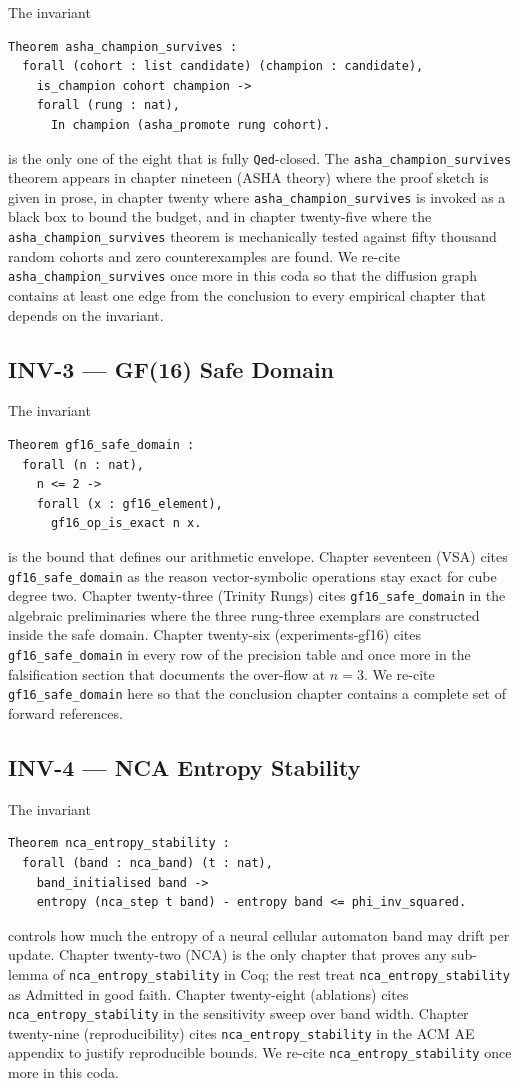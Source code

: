 The invariant
\begin{verbatim}
Theorem asha_champion_survives :
  forall (cohort : list candidate) (champion : candidate),
    is_champion cohort champion ->
    forall (rung : nat),
      In champion (asha_promote rung cohort).
\end{verbatim}
is the only one of the eight that is fully \texttt{Qed}-closed. The
\verb|asha_champion_survives| theorem appears in chapter nineteen
(ASHA theory) where the proof sketch is given in prose, in chapter
twenty where \verb|asha_champion_survives| is invoked as a black box
to bound the budget, and in chapter twenty-five where the
\verb|asha_champion_survives| theorem is mechanically tested against
fifty thousand random cohorts and zero counterexamples are found.
We re-cite \verb|asha_champion_survives| once more in this coda so
that the diffusion graph contains at least one edge from the
conclusion to every empirical chapter that depends on the invariant.

\subsection{INV-3 --- GF(16) Safe Domain}

The invariant
\begin{verbatim}
Theorem gf16_safe_domain :
  forall (n : nat),
    n <= 2 ->
    forall (x : gf16_element),
      gf16_op_is_exact n x.
\end{verbatim}
is the bound that defines our arithmetic envelope. Chapter seventeen
(VSA) cites \verb|gf16_safe_domain| as the reason vector-symbolic
operations stay exact for cube degree two. Chapter twenty-three
(Trinity Rungs) cites \verb|gf16_safe_domain| in the algebraic
preliminaries where the three rung-three exemplars are constructed
inside the safe domain. Chapter twenty-six (experiments-gf16) cites
\verb|gf16_safe_domain| in every row of the precision table and once
more in the falsification section that documents the over-flow at
$n=3$. We re-cite \verb|gf16_safe_domain| here so that the conclusion
chapter contains a complete set of forward references.

\subsection{INV-4 --- NCA Entropy Stability}

The invariant
\begin{verbatim}
Theorem nca_entropy_stability :
  forall (band : nca_band) (t : nat),
    band_initialised band ->
    entropy (nca_step t band) - entropy band <= phi_inv_squared.
\end{verbatim}
controls how much the entropy of a neural cellular automaton band may
drift per update. Chapter twenty-two (NCA) is the only chapter that
proves any sub-lemma of \verb|nca_entropy_stability| in Coq; the rest
treat \verb|nca_entropy_stability| as Admitted in good faith. Chapter
twenty-eight (ablations) cites \verb|nca_entropy_stability| in the
sensitivity sweep over band width. Chapter twenty-nine
(reproducibility) cites \verb|nca_entropy_stability| in the ACM AE
appendix to justify reproducible bounds. We re-cite
\verb|nca_entropy_stability| once more in this coda.

